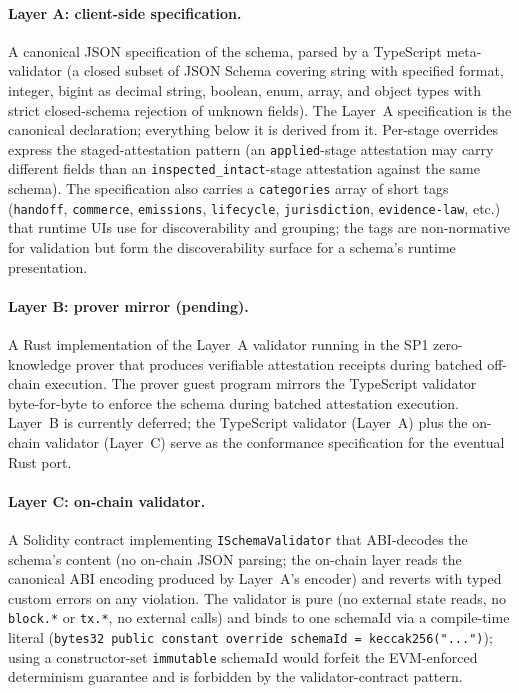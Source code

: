 \documentclass[11pt,a4paper]{article}
\theoremstyle{definition}
\theoremstyle{remark}
\begin{document}
\paragraph{Layer A: client-side specification.}
A canonical JSON specification of the schema, parsed by a TypeScript
meta-validator (a closed subset of JSON Schema covering string with
specified format, integer, bigint as decimal string, boolean, enum,
array, and object types with strict closed-schema rejection of
unknown fields). The Layer~A specification is the canonical
declaration; everything below it is derived from it. Per-stage
overrides express the staged-attestation pattern (an
\texttt{applied}-stage attestation may carry different fields than
an \texttt{inspected\_intact}-stage attestation against the same
schema). The specification also carries a
\texttt{categories} array of short tags
(\texttt{handoff}, \texttt{commerce}, \texttt{emissions},
\texttt{lifecycle}, \texttt{jurisdiction}, \texttt{evidence-law},
etc.) that runtime UIs use for discoverability and grouping; the tags
are non-normative for validation but form the discoverability surface
for a schema's runtime presentation.

\paragraph{Layer B: prover mirror (pending).}
A Rust implementation of the Layer~A validator running in the SP1
zero-knowledge prover that produces verifiable attestation receipts
during batched off-chain execution. The prover guest program mirrors
the TypeScript validator byte-for-byte to enforce the schema during
batched attestation execution. Layer~B is currently deferred; the
TypeScript validator (Layer~A) plus the on-chain validator (Layer~C)
serve as the conformance specification for the eventual Rust port.

\paragraph{Layer C: on-chain validator.}
A Solidity contract implementing \texttt{ISchemaValidator} that
ABI-decodes the schema's content (no on-chain JSON parsing; the
on-chain layer reads the canonical ABI encoding produced by Layer~A's
encoder) and reverts with typed custom errors on any violation. The
validator is pure (no external state reads, no \texttt{block.*} or
\texttt{tx.*}, no external calls) and binds to one schemaId via a
compile-time literal (\texttt{bytes32 public constant override
schemaId = keccak256("...")}); using a constructor-set
\texttt{immutable} schemaId would forfeit the EVM-enforced
determinism guarantee and is forbidden by the validator-contract
pattern.
\end{document}
